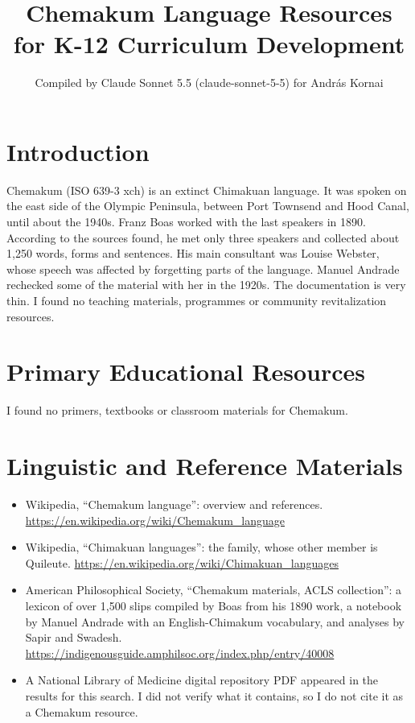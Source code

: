 \documentclass[12pt]{article}
\title{Chemakum Language Resources for K-12 Curriculum Development}
\author{Compiled by Claude Sonnet 5.5 (claude-sonnet-5-5) for Andr\'as Kornai}
\date{}
\begin{document}
\maketitle

\section{Introduction}
Chemakum (ISO 639-3 xch) is an extinct Chimakuan language. It was spoken on the east side of the Olympic Peninsula, between Port Townsend and Hood Canal, until about the 1940s. Franz Boas worked with the last speakers in 1890. According to the sources found, he met only three speakers and collected about 1,250 words, forms and sentences. His main consultant was Louise Webster, whose speech was affected by forgetting parts of the language. Manuel Andrade rechecked some of the material with her in the 1920s. The documentation is very thin. I found no teaching materials, programmes or community revitalization resources.

\section{Primary Educational Resources}
I found no primers, textbooks or classroom materials for Chemakum.

\section{Linguistic and Reference Materials}
\begin{itemize}
\item Wikipedia, ``Chemakum language'': overview and references. \url{https://en.wikipedia.org/wiki/Chemakum_language}
\item Wikipedia, ``Chimakuan languages'': the family, whose other member is Quileute. \url{https://en.wikipedia.org/wiki/Chimakuan_languages}
\item American Philosophical Society, ``Chemakum materials, ACLS collection'': a lexicon of over 1,500 slips compiled by Boas from his 1890 work, a notebook by Manuel Andrade with an English-Chimakum vocabulary, and analyses by Sapir and Swadesh. \url{https://indigenousguide.amphilsoc.org/index.php/entry/40008}
\item A National Library of Medicine digital repository PDF appeared in the results for this search. I did not verify what it contains, so I do not cite it as a Chemakum resource.
\end{itemize}
\end{document}
